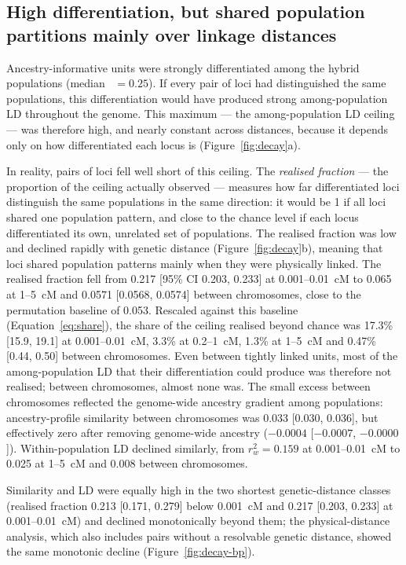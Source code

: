 \subsection{High differentiation, but shared population partitions mainly over linkage distances}

Ancestry-informative units were strongly differentiated among the hybrid populations (median \FST\ $=0.25$). If every pair of loci had distinguished the same populations, this differentiation would have produced strong among-population LD throughout the genome. This maximum --- the among-population LD ceiling --- was therefore high, and nearly constant across distances, because it depends only on how differentiated each locus is (Figure~\ref{fig:decay}a).

In reality, pairs of loci fell well short of this ceiling. The \emph{realised fraction} --- the proportion of the ceiling actually observed --- measures how far differentiated loci distinguish the same populations in the same direction: it would be 1 if all loci shared one population pattern, and close to the chance level if each locus differentiated its own, unrelated set of populations. The realised fraction was low and declined rapidly with genetic distance (Figure~\ref{fig:decay}b), meaning that loci shared population patterns mainly when they were physically linked. The realised fraction fell from 0.217 [95\% CI 0.203, 0.233] at 0.001--0.01~cM to 0.065 at 1--5~cM and 0.0571 [0.0568, 0.0574] between chromosomes, close to the permutation baseline of 0.053. Rescaled against this baseline (Equation~\eqref{eq:share}), the share of the ceiling realised beyond chance was 17.3\% [15.9, 19.1] at 0.001--0.01~cM, 3.3\% at 0.2--1~cM, 1.3\% at 1--5~cM and 0.47\% [0.44, 0.50] between chromosomes. Even between tightly linked units, most of the among-population LD that their differentiation could produce was therefore not realised; between chromosomes, almost none was. The small excess between chromosomes reflected the genome-wide ancestry gradient among populations: ancestry-profile similarity between chromosomes was 0.033 [0.030, 0.036], but effectively zero after removing genome-wide ancestry ($-0.0004$ [$-0.0007$, $-0.0000$]). Within-population LD declined similarly, from $r_w^2=0.159$ at 0.001--0.01~cM to 0.025 at 1--5~cM and 0.008 between chromosomes.

Similarity and LD were equally high in the two shortest genetic-distance classes (realised fraction 0.213 [0.171, 0.279] below 0.001~cM and 0.217 [0.203, 0.233] at 0.001--0.01~cM) and declined monotonically beyond them; the physical-distance analysis, which also includes pairs without a resolvable genetic distance, showed the same monotonic decline (Figure~\ref{fig:decay-bp}).

